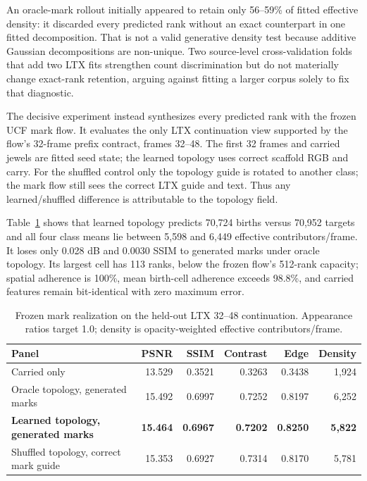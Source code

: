 \documentclass[10pt]{article}
\begin{document}
An oracle-mark rollout initially appeared to retain only 56--59\% of fitted effective density: it
discarded every predicted rank without an exact counterpart in one fitted decomposition. That is
not a valid generative density test because additive Gaussian decompositions are non-unique. Two
source-level cross-validation folds that add two LTX fits strengthen count discrimination but do
not materially change exact-rank retention, arguing against fitting a larger corpus solely to fix
that diagnostic.

The decisive experiment instead synthesizes every predicted rank with the frozen UCF mark flow.
It evaluates the only LTX continuation view supported by the flow's 32-frame prefix contract,
frames 32--48. The first 32 frames and carried jewels are fitted seed state; the learned topology
uses correct scaffold RGB and carry. For the shuffled control only the topology guide is rotated to
another class; the mark flow still sees the correct LTX guide and text. Thus any learned/shuffled
difference is attributable to the topology field.

Table~\ref{tab:autonomoustopology} shows that learned topology predicts 70,724 births versus 70,952
targets and all four class means lie between 5,598 and 6,449 effective contributors/frame. It loses
only 0.028 dB and 0.0030 SSIM to generated marks under oracle topology. Its largest cell has 113
ranks, below the frozen flow's 512-rank capacity; spatial adherence is 100\%, mean birth-cell
adherence exceeds 98.8\%, and carried features remain bit-identical with zero maximum error.

\begin{table}[H]
\centering
\small
\caption{Frozen mark realization on the held-out LTX 32--48 continuation. Appearance ratios target
1.0; density is opacity-weighted effective contributors/frame.}
\label{tab:autonomoustopology}
\begin{tabular}{@{}lrrrrr@{}}
\toprule
Panel & PSNR & SSIM & Contrast & Edge & Density \\
\midrule
Carried only & 13.529 & 0.3521 & 0.3263 & 0.3438 & 1,924 \\
Oracle topology, generated marks & 15.492 & 0.6997 & 0.7252 & 0.8197 & 6,252 \\
\textbf{Learned topology, generated marks} & \textbf{15.464} & \textbf{0.6967} & \textbf{0.7202} & \textbf{0.8250} & \textbf{5,822} \\
Shuffled topology, correct mark guide & 15.353 & 0.6927 & 0.7314 & 0.8170 & 5,781 \\
\bottomrule
\end{tabular}
\end{table}
\end{document}

